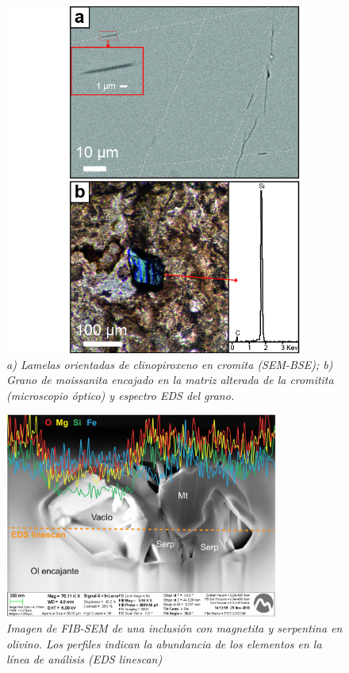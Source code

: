 \documentclass[a4paper,11pt]{article}
\begin{document}
		\begin{figure}[h]
			\centering
			\includegraphics[width=100mm]{Figura2.jpg}
			\caption{\sl a) Lamelas orientadas de clinopiroxeno en cromita (SEM-BSE); b) Grano de moissanita encajado en la matriz alterada de la cromitita (microscopio óptico) y espectro EDS del grano.}
			\label{Fig2}
		\end{figure}
		
		\begin{figure}[h]
			\centering
			\includegraphics[width=90mm]{Figura3.jpg}
			\caption{\sl Imagen de FIB-SEM de una inclusión con magnetita y serpentina en olivino. Los perfiles indican la abundancia de los elementos en la línea de análisis (EDS linescan)}
			\label{Fig3}
		\end{figure}
\end{document}
